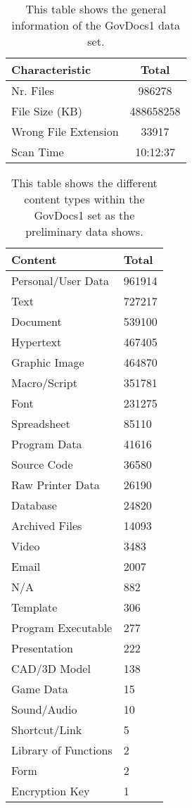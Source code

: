 \begin{table}[b]
\centering
\begin{tabular}{l || c }
\hline
Characteristic & Total \\
\hline
\hline
Nr. Files & 986278 \\
File Size (KB) & 488658258 \\
Wrong File Extension & 33917 \\
Scan Time & 10:12:37 \\
\hline
\end{tabular}
\caption{This table shows the general information of the GovDocs1 data set.}
\label{tab:govdoc1_general_info}
\end{table}

\begin{table}
\centering
\begin{tabular}{l || l }
\hline
Content & Total \\
\hline
\hline
  Personal/User Data & 961914\\
  Text & 727217 \\
  Document & 539100 \\
  Hypertext & 467405 \\
  Graphic Image & 464870 \\
  Macro/Script &    351781 \\
  Font & 231275 \\
  Spreadsheet & 85110\\
  Program Data  &      41616\\
  Source Code & 36580 \\
  Raw Printer Data &  26190 \\
  Database & 24820 \\
  Archived Files & 14093 \\
  Video &  3483 \\
  Email & 2007 \\
  N/A  & 882 \\
  Template & 306\\
  Program Executable & 277\\
  Presentation & 222 \\
  CAD/3D Model & 138 \\
  Game Data &15\\
  Sound/Audio & 10 \\
  Shortcut/Link & 5 \\
  Library of Functions & 2\\
  Form & 2 \\
  Encryption Key  & 1\\
\hline
\end{tabular}
\label{tab:govdoc1_content}
\caption{This table shows the different content types within the GovDocs1 set as the preliminary data shows.}
\end{table}

